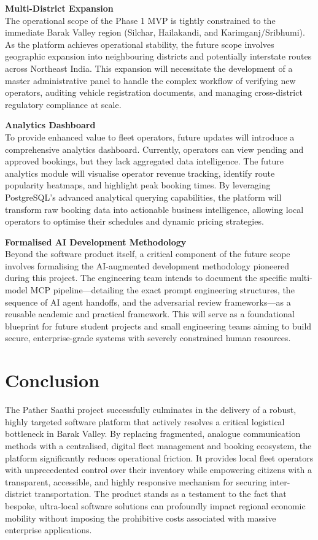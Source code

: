 \documentclass[12pt,a4paper]{report}
\begin{document}
\textbf{Multi-District Expansion}\\
The operational scope of the Phase 1 MVP is tightly constrained to the immediate Barak Valley region (Silchar, Hailakandi, and Karimganj/Sribhumi). As the platform achieves operational stability, the future scope involves geographic expansion into neighbouring districts and potentially interstate routes across Northeast India. This expansion will necessitate the development of a master administrative panel to handle the complex workflow of verifying new operators, auditing vehicle registration documents, and managing cross-district regulatory compliance at scale.

\textbf{Analytics Dashboard}\\
To provide enhanced value to fleet operators, future updates will introduce a comprehensive analytics dashboard. Currently, operators can view pending and approved bookings, but they lack aggregated data intelligence. The future analytics module will visualise operator revenue tracking, identify route popularity heatmaps, and highlight peak booking times. By leveraging PostgreSQL's advanced analytical querying capabilities, the platform will transform raw booking data into actionable business intelligence, allowing local operators to optimise their schedules and dynamic pricing strategies.

\textbf{Formalised AI Development Methodology}\\
Beyond the software product itself, a critical component of the future scope involves formalising the AI-augmented development methodology pioneered during this project. The engineering team intends to document the specific multi-model MCP pipeline---detailing the exact prompt engineering structures, the sequence of AI agent handoffs, and the adversarial review frameworks---as a reusable academic and practical framework. This will serve as a foundational blueprint for future student projects and small engineering teams aiming to build secure, enterprise-grade systems with severely constrained human resources.

\chapter{Conclusion}

The Pather Saathi project successfully culminates in the delivery of a robust, highly targeted software platform that actively resolves a critical logistical bottleneck in Barak Valley. By replacing fragmented, analogue communication methods with a centralised, digital fleet management and booking ecosystem, the platform significantly reduces operational friction. It provides local fleet operators with unprecedented control over their inventory while empowering citizens with a transparent, accessible, and highly responsive mechanism for securing inter-district transportation. The product stands as a testament to the fact that bespoke, ultra-local software solutions can profoundly impact regional economic mobility without imposing the prohibitive costs associated with massive enterprise applications.
\end{document}

